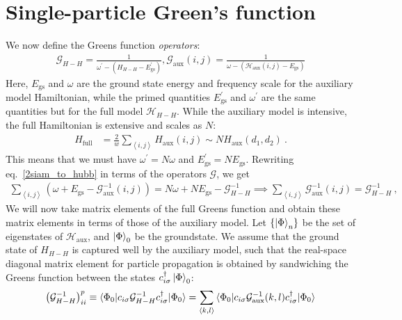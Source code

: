 \documentclass{report}
\numberwithin{equation}{section}
\begin{document}
\section{Single-particle Green's function}
We now define the Greens function {\it operators}:
\begin{equation}\begin{aligned}
	\mathcal{G}_{H-H} = \frac{1}{\omega^\prime - \left(H_{H-H} - E_\text{gs}^\prime\right) }, \mathcal{G}_\text{aux}(i,j) = \frac{1}{\omega - \left(\mathcal{H}_\text{aux}(i,j) - E_\text{gs}\right)}
\end{aligned}\end{equation}
Here, \(E_\text{gs}\) and \(\omega\) are the ground state energy and frequency scale for the auxiliary model Hamiltonian, while the primed quantities \(E_\text{gs}^\prime\) and \(\omega^\prime\) are the same quantities but for the full model \(\mathcal{H}_{H-H}\). While the auxiliary model is intensive, the full Hamiltonian is extensive and scales as \(N\):
\begin{equation}\begin{aligned}
	H_\text{full} &= \frac{2}{w}\sum_{\left<i,j\right>} H_\text{aux}(i,j) \sim N H_\text{aux}(d_1,d_2)~.
\end{aligned}\end{equation}
This means that we must have \(\omega^\prime = N\omega\) and \(E_\text{gs}^\prime = N E_\text{gs}\).
Rewriting eq.~\ref{2siam_to_hubb} in terms of the operators \(\mathcal{G}\), we get
\begin{equation}\begin{aligned}
\sum_{\left<i,j \right>} \left(\omega + E_\text{gs} - \mathcal{G}^{-1}_\text{aux}(i,j)\right) = N\omega + N E_\text{gs} - \mathcal{G}^{-1}_{H-H} \implies \sum_{\left<i,j \right>} \mathcal{G}^{-1}_\text{aux}(i,j) = \mathcal{G}^{-1}_{H-H}~,
\end{aligned}\end{equation}
We will now take matrix elements of the full Greens function and obtain these matrix elements in terms of those of the auxiliary model. Let \(\left\{ \ket{\Phi}_n \right\} \) be the set of eigenstates of \(\mathcal{H}_\text{aux}\), and \(\ket{\Phi}_0\) be the groundstate. We assume that the ground state of \(H_{H-H}\) is captured well by the auxiliary model, such that the real-space diagonal matrix element for particle propagation is obtained by sandwiching the Greens function between the states \(c^\dagger_{i\sigma}\ket{\Phi}_0\):
\begin{equation}\begin{aligned}
	\left(\mathcal{G}^{-1}_{H-H}\right)^p_{ii} \equiv \braket{\Phi_0 | c_{i\sigma} \mathcal{G}^{-1}_{H-H} c^\dagger_{i\sigma} | \Phi_0} = \sum_{\left<k,l\right>} \braket{\Phi_0 | c_{i\sigma} \mathcal{G}^{-1}_\text{aux}(k,l) c^\dagger_{i\sigma} | \Phi_0}
\end{aligned}\end{equation}
\end{document}

